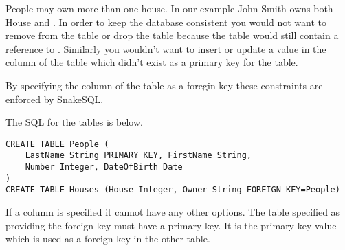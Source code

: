 \documentclass{howto}
\begin{document}
People may own more than one house. In our example John Smith owns both House  and . In order to keep the database consistent you would not want to remove  from the  table or drop the  table because the  table would still contain a reference to . Similarly you wouldn't want to insert or update a value in the  column of the  table which didn't exist as a primary key for the  table.

By specifying the  column of the  table as a foregin key these constraints are enforced by SnakeSQL.

The SQL for the tables is below. 

\begin{verbatim}
CREATE TABLE People (
    LastName String PRIMARY KEY, FirstName String, 
    Number Integer, DateOfBirth Date
)
CREATE TABLE Houses (House Integer, Owner String FOREIGN KEY=People)
\end{verbatim}

If a column is specified  it cannot have any other options. The table specified as providing the foreign key must have a primary key. It is the primary key value which is used as a foreign key in the other table.





\end{document}
